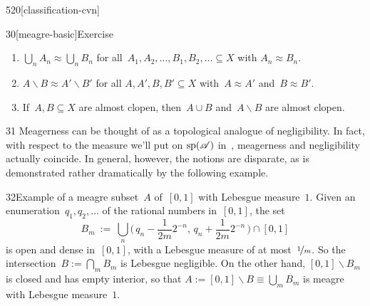 \begin{parsec}{520}[classification-cvn]
\begin{point}{30}[meagre-basic]{Exercise}
\begin{enumerate}
(Hint: show that $\overline{U}\backslash U$
is closed with empty interior.)
\item
$\bigcup_n A_n\approx \bigcup_n B_n$
for all~$A_1,A_2,\dotsc, B_1,B_2,\dotsc\subseteq X$
with $A_n\approx B_n$.
\item
$A\backslash B \approx A'\backslash B'$
for all $A,A',B,B'\subseteq X$
with~$A\approx A'$ and~$B\approx B'$.
\item
If~$A,B\subseteq X$ are almost clopen,
then~$A\cup B$ and~$A\backslash B$ 
are almost clopen.
\end{enumerate}
\spacingfix
\end{point}%
\begin{point}{31}%
Meagerness can be thought of as a topological analogue of negligibility.
In fact, with respect to the measure we'll put on $\mathrm{sp}(\mathscr{A})$
in~,
    meagerness and negligibility actually coincide.
In general, however, 
the notions are disparate,
as is demonstrated rather dramatically by the following example.
\end{point}
\begin{point}{32}{Example}
of a meagre subset~$A$ of~$[0,1]$
with Lebesgue measure~$1$.
Given an enumeration~$q_1,q_2,\dotsc$
    of the rational numbers in~$[0,1]$,
the set
\begin{equation*}
    \textstyle
    B_m \ :=\  \bigcup_n 
    \bigl(\,q_n-\frac{1}{2m}2^{-n},\,q_n+\frac{1}{2m}2^{-n}\,\bigr)
    \cap[0,1]
\end{equation*}
is open and dense in~$[0,1]$, with a Lebesgue measure 
of at most~$\nicefrac{1}{m}$.
So the intersection~$B:=\bigcap_m B_m$ is Lebesgue negligible.
On the other hand, $[0,1]\backslash B_m$
is closed and has empty interior,
so that $A:=[0,1]\backslash B\equiv \bigcup_m B_m$
is meagre with Lebesgue measure~$1$.
\end{point}
\end{parsec}
